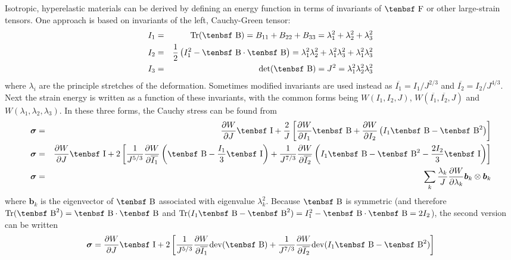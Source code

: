 \documentclass[11pt]{book}
\renewcommand{\vec}[1]{\boldsymbol{#1}}
\newcommand{\tens}[1]{\boldsymbol{\mathsf{#1}}}
\def\B{\hbox{\tenbsf B}}
\def\F{\hbox{\tenbsf F}}
\def\I{\hbox{\tenbsf I}}
\begin{document}
Isotropic, hyperelastic materials can be derived by defining an energy function in terms of invariants of $\F$ or other large-strain tensors. One approach is based on invariants of the left, Cauchy-Green tensor:
\begin{eqnarray}
          I_1 & = & {\rm Tr}(\B) = B_{11} + B_{22} + B_{33} = \lambda_1^2 +  \lambda_2^2 + \lambda_3^2 \\
          I_2 & = & {1\over2}\left(I_1^2 - \B\cdot \B\right) = \lambda_1^2\lambda_2^2 + \lambda_1^2\lambda_3^2 + \lambda_1^2\lambda_3^2\\
          I_3 & = & {\rm det}(\B) = J^2 = \lambda_1^2\lambda_2^2\lambda_3^2
\end{eqnarray}
where $\lambda_i$ are the principle stretches of the deformation.
Sometimes modified invariants are used instead as $\overline{I_1} = I_1/J^{2/3}$ and $\overline{I_2} = I_2/J^{4/3}$. Next the strain energy is written as a function of these invariants, with the common forms being $W(I_1,I_2,J)$, $W(\overline{I_1},\overline{I_2},J)$ and $W( \lambda_1,\lambda_2,\lambda_3)$. In these three forms, the Cauchy stress can be found from
\begin{eqnarray}
   \tens\sigma & = & {\partial W\over \partial J}\I + {2\over J}\left[ {\partial W\over \partial I_1}\B
                                             + {\partial W\over \partial I_2}\left(I_1\B- \B^2\right)
                                            \right]      \\
   \tens\sigma & = & {\partial W\over \partial J}\I + 2\left[ {1\over J^{5/3}}
                           {\partial W\over \partial \overline{I_1}}\left(\B -  {I_1\over 3}\I\right)
                           + {1\over J^{7/3}}{\partial W\over \partial \overline{I_2}}\left( I_1 \B- \B^2 - {2I_2\over 3}\I  \right)
                             \right] \\
   \tens\sigma & = & \sum_k {\lambda_k\over J} {\partial W\over\partial \lambda_k} \vec b_k\otimes\vec b_k
\end{eqnarray}
where $\vec b_k$ is the eigenvector of $\B$ associated with eigenvalue $\lambda_k^2$.
Because $\B$ is symmetric (and therefore ${\rm Tr}(\B^2) = \B\cdot\B$ and ${\rm Tr}(I_1\B-\B^2)=I_1^2-\B\cdot\B = 2I_2$), the second version can be written
\begin{equation}
           \tens\sigma = {\partial W\over \partial J}\I + 2\left[ {1\over J^{5/3}}
                                           {\partial W\over \partial \overline{I_1}}{\rm dev}(\B)
                                        + {1\over J^{7/3}}{\partial W\over \partial \overline{I_2}}{\rm dev}( I_1 \B- \B^2)
                                           \right]
\end{equation}
\end{document}
